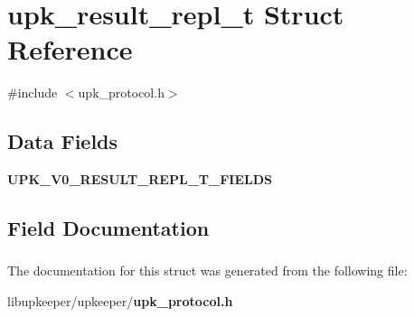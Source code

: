 \section{upk\_\-result\_\-repl\_\-t Struct Reference}
\label{structupk__result__repl__t}


{\ttfamily \#include $<$upk\_\-protocol.h$>$}

\subsection*{Data Fields}
\begin{DoxyCompactItemize}
\item 
{\bf UPK\_\-V0\_\-RESULT\_\-REPL\_\-T\_\-FIELDS}
\end{DoxyCompactItemize}


\subsection{Field Documentation}
\subsubsection[{UPK\_\-V0\_\-RESULT\_\-REPL\_\-T\_\-FIELDS}]{}\label{structupk__result__repl__t_a62039c161bc2e22d036318a7a873d06d}


The documentation for this struct was generated from the following file:\begin{DoxyCompactItemize}
\item 
libupkeeper/upkeeper/{\bf upk\_\-protocol.h}\end{DoxyCompactItemize}
